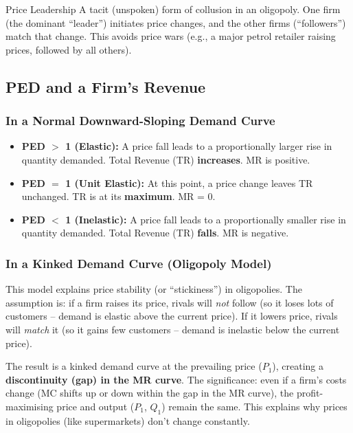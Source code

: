 \documentclass[11pt, a4paper, twoside]{book}
\begin{document}
\begin{keyterm}{Price Leadership}
A tacit (unspoken) form of collusion in an oligopoly. One firm (the dominant ``leader'') initiates price changes, and the other firms (``followers'') match that change. This avoids price wars (e.g., a major petrol retailer raising prices, followed by all others).
\end{keyterm}

\subsection{PED and a Firm's Revenue}

\subsubsection{In a Normal Downward-Sloping Demand Curve}

\begin{itemize}
  \item \textbf{PED $>$ 1 (Elastic):} A price fall leads to a proportionally larger rise in quantity demanded. Total Revenue (TR) \textbf{increases}. MR is positive.
  \item \textbf{PED $=$ 1 (Unit Elastic):} At this point, a price change leaves TR unchanged. TR is at its \textbf{maximum}. MR = 0.
  \item \textbf{PED $<$ 1 (Inelastic):} A price fall leads to a proportionally smaller rise in quantity demanded. Total Revenue (TR) \textbf{falls}. MR is negative.
\end{itemize}

\subsubsection{In a Kinked Demand Curve (Oligopoly Model)}

This model explains price stability (or ``stickiness'') in oligopolies. The assumption is: if a firm raises its price, rivals will \emph{not} follow (so it loses lots of customers -- demand is elastic above the current price). If it lowers price, rivals will \emph{match} it (so it gains few customers -- demand is inelastic below the current price).

The result is a kinked demand curve at the prevailing price ($P_1$), creating a \textbf{discontinuity (gap) in the MR curve}. The significance: even if a firm's costs change (MC shifts up or down within the gap in the MR curve), the profit-maximising price and output ($P_1$, $Q_1$) remain the same. This explains why prices in oligopolies (like supermarkets) don't change constantly.
\end{document}
